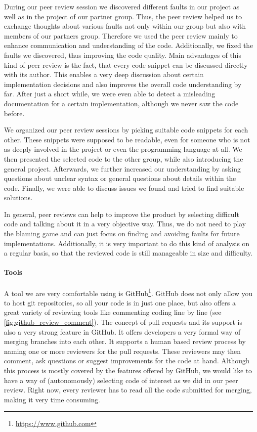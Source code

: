 \documentclass{scrreprt}
\begin{document}
During our peer review session we discovered different faults in our project as well as in the project of our partner group. Thus, the peer review helped us to exchange thoughts about various faults not only within our group but also with members of our partners group. Therefore we used the peer review mainly to enhance communication and understanding of the code. Additionally, we fixed the faults we discovered, thus improving the code quality. Main advantages of this kind of peer review is the fact, that every code snippet can be discussed directly with its author. This enables a very deep discussion about certain implementation decisions and also improves the overall code understanding by far. After just a short while, we were even able to detect a misleading documentation for a certain implementation, although we never saw the code before. 

We organized our peer review sessions by picking suitable code snippets for each other. These snippets were supposed to be readable, even for someone who is not as deeply involved in the project or even the programming language at all. We then presented the selected code to the other group, while also introducing the general project. Afterwards, we further increased our understanding by asking questions about unclear syntax or general questions about details within the code. Finally, we were able to discuss issues we found and tried to find suitable solutions.

In general, peer reviews can help to improve the product by selecting difficult code and talking about it in a very objective way. Thus, we do not need to play the blaming game and can just focus on finding and avoiding faults for future implementations. Additionally, it is very important to do this kind of analysis on a regular basis, so that the reviewed code is still manageable in size and difficulty. 

\paragraph{Tools}

A tool we are very comfortable using is GitHub\footnote{\url{https://www.github.com}}. GitHub does not only allow you to host git repositories, so all your code is in just one place, but also offers a great variety of reviewing tools like commenting coding line by line (see \vref{fig:github_review_comment}). The concept of pull requests and its support is also a very strong feature in GitHub. It offers developers a very formal way of merging branches into each other. It supports a human based review process by naming one or more reviewers for the pull requests. These reviewers may then comment, ask questions or suggest improvements for the code at hand. Although this process is mostly covered by the features offered by GitHub, we would like to have a way of (autonomously) selecting code of interest as we did in our peer review. Right now, every reviewer has to read all the code submitted for merging, making it very time consuming.
\end{document}
